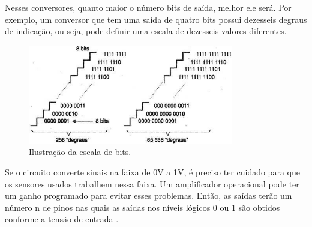 Nesses conversores, quanto maior o número bits de saída, melhor ele será. Por exemplo, um conversor que tem uma saída de quatro bits possui dezesseis degraus de indicação, ou seja, pode definir uma escala de dezesseis valores diferentes.

\begin{figure}[H]
  \centering
  \includegraphics[width=0.8\textwidth]{figuras/ADC}
  \caption{Ilustração da escala de bits.}
  \label{img:escaladebits}
\end{figure}

Se o circuito converte sinais na faixa de 0V a 1V, é preciso ter cuidado para que os sensores usados trabalhem nessa faixa. Um amplificador operacional pode ter um ganho programado para evitar esses problemas. Então, as saídas terão um número n de pinos nas quais as saídas nos níveis lógicos 0 ou 1 são obtidos conforme a tensão de entrada \cite{conversoresad}.
